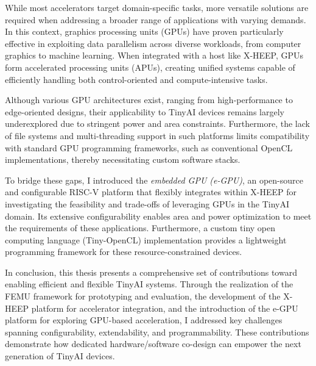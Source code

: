     While most accelerators target domain-specific tasks, more versatile solutions are required when addressing a broader range of applications with varying demands. In this context, graphics processing units (GPUs) have proven particularly effective in exploiting data parallelism across diverse workloads, from computer graphics to machine learning. When integrated with a host like X-HEEP, GPUs form accelerated processing units (APUs), creating unified systems capable of efficiently handling both control-oriented and compute-intensive tasks.
    
    Although various GPU architectures exist, ranging from high-performance to edge-oriented designs, their applicability to \mbox{TinyAI} devices remains largely underexplored due to stringent power and area constraints. Furthermore, the lack of file systems and multi-threading support in such platforms limits compatibility with standard GPU programming frameworks, such as conventional OpenCL implementations, thereby necessitating custom software stacks.

    \thispagestyle{plain}
    To bridge these gaps, I introduced the \textit{embedded GPU (e-GPU)}, an open-source and configurable RISC-V platform that flexibly integrates within X-HEEP for investigating the feasibility and trade-offs of leveraging GPUs in the \mbox{TinyAI} domain. Its extensive configurability enables area and power optimization to meet the requirements of these applications. Furthermore, a custom tiny open computing language (Tiny-OpenCL) implementation provides a lightweight programming framework for these resource-constrained devices.
    
    In conclusion, this thesis presents a comprehensive set of contributions toward enabling efficient and flexible \mbox{TinyAI} systems. Through the realization of the \mbox{FEMU} framework for prototyping and evaluation, the development of the X-HEEP platform for accelerator integration, and the introduction of the e-GPU platform for exploring GPU-based acceleration, I addressed key challenges spanning configurability, extendability, and programmability. These contributions demonstrate how dedicated hardware/software co-design can empower the next generation of \mbox{TinyAI} devices.

\setlength{\parskip}{0em}

